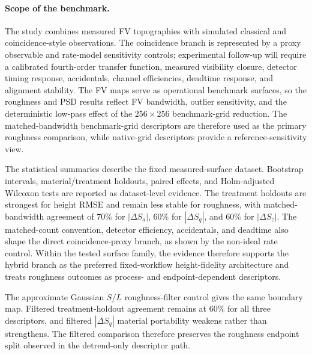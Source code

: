\documentclass[photonics,article,submit,pdftex,moreauthors]{Definitions/mdpi}
\begin{document}


\paragraph{Scope of the benchmark.}
The study combines measured FV topographies with simulated classical and coincidence-style observations. The coincidence branch is represented by a proxy observable and rate-model sensitivity controls; experimental follow-up will require a calibrated fourth-order transfer function, measured visibility closure, detector timing response, accidentals, channel efficiencies, deadtime response, and alignment stability. The FV maps serve as operational benchmark surfaces, so the roughness and PSD results reflect FV bandwidth, outlier sensitivity, and the deterministic low-pass effect of the $256\times256$ benchmark-grid reduction. The matched-bandwidth benchmark-grid descriptors are therefore used as the primary roughness comparison, while native-grid descriptors provide a reference-sensitivity view.

The statistical summaries describe the fixed measured-surface dataset. Bootstrap intervals, material/treatment holdouts, paired effects, and Holm-adjusted Wilcoxon tests are reported as dataset-level evidence. The treatment holdouts are strongest for height RMSE and remain less stable for roughness, with matched-bandwidth agreement of 70\% for $|\Delta S_a|$, 60\% for $|\Delta S_q|$, and 60\% for $|\Delta S_z|$. The matched-count convention, detector efficiency, accidentals, and deadtime also shape the direct coincidence-proxy branch, as shown by the non-ideal rate control. Within the tested surface family, the evidence therefore supports the hybrid branch as the preferred fixed-workflow height-fidelity architecture and treats roughness outcomes as process- and endpoint-dependent descriptors.

The approximate Gaussian $S/L$ roughness-filter control gives the same boundary map. Filtered treatment-holdout agreement remains at 60\% for all three descriptors, and filtered $|\Delta S_q|$ material portability weakens rather than strengthens. The filtered comparison therefore preserves the roughness endpoint split observed in the detrend-only descriptor path.

\end{document}
